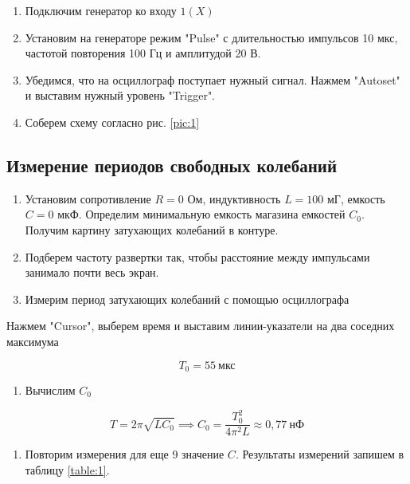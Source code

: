 \documentclass[a4paper,12pt]{article}
\begin{document}
\begin{enumerate}
    \item Подключим генератор ко входу $1(X)$
    \item Установим на генераторе режим "Pulse" с длительностью импульсов 10 мкс, частотой повторения 100 Гц и амплитудой 20 В.
    \item Убедимся, что на осциллограф поступает нужный сигнал. Нажмем "Autoset" и выставим нужный уровень "Trigger".
    \item Соберем схему согласно рис. \ref{pic:1}
\end{enumerate}

\subsection{Измерение периодов свободных колебаний}

\begin{enumerate}
    \item Установим сопротивление $R = 0$ Ом, индуктивность $L = 100$ мГ, емкость $C = 0$ мкФ. Определим минимальную емкость магазина емкостей $C_0$. Получим картину затухающих колебаний в контуре.
    \item Подберем частоту развертки так, чтобы расстояние между импульсами занимало почти весь экран.
    \item Измерим период затухающих колебаний с помощью осциллографа
\end{enumerate}

Нажмем "Cursor", выберем время и выставим линии-указатели на два соседних максимума

\begin{equation*}
    T_0 = 55 \ \text{мкс}
\end{equation*}

\begin{enumerate}[resume]
    \item Вычислим $C_0$
\end{enumerate}

\begin{equation*}
    T = 2 \pi \sqrt{L C_0} \implies C_0 = \frac{T_0^2}{4 \pi^2 L} \approx 0,77 \ \text{нФ}
\end{equation*}

\begin{enumerate}[resume]
    \item Повторим измерения для еще 9 значение $C$. Результаты измерений запишем в таблицу \ref{table:1}.
\end{enumerate}
\end{document}
